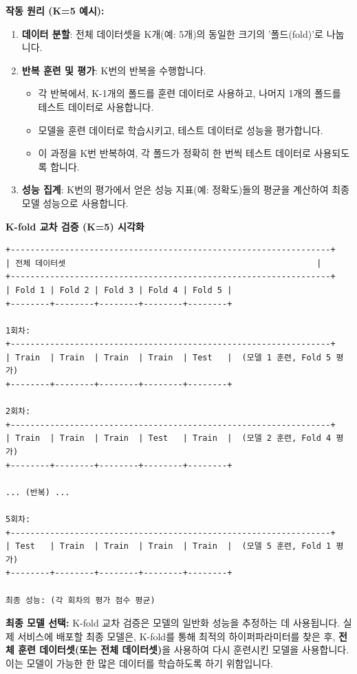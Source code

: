 \documentclass[11pt,a4paper]{article}
\theoremstyle{definition}
\begin{document}
\textbf{작동 원리 (K=5 예시):}
\begin{enumerate}
    \item \textbf{데이터 분할}: 전체 데이터셋을 K개(예: 5개)의 동일한 크기의 '폴드(fold)'로 나눕니다.
    \item \textbf{반복 훈련 및 평가}: K번의 반복을 수행합니다.
        \begin{itemize}
            \item 각 반복에서, K-1개의 폴드를 훈련 데이터로 사용하고, 나머지 1개의 폴드를 테스트 데이터로 사용합니다.
            \item 모델을 훈련 데이터로 학습시키고, 테스트 데이터로 성능을 평가합니다.
            \item 이 과정을 K번 반복하여, 각 폴드가 정확히 한 번씩 테스트 데이터로 사용되도록 합니다.
        \end{itemize}
    \item \textbf{성능 집계}: K번의 평가에서 얻은 성능 지표(예: 정확도)들의 평균을 계산하여 최종 모델 성능으로 사용합니다.
\end{enumerate}

\begin{center}
\textbf{K-fold 교차 검증 (K=5) 시각화}
\begin{verbatim}
+-----------------------------------------------------------------+
| 전체 데이터셋                                                   |
+-----------------------------------------------------------------+
| Fold 1 | Fold 2 | Fold 3 | Fold 4 | Fold 5 |
+--------+--------+--------+--------+--------+

1회차:
+-----------------------------------------------------------------+
| Train  | Train  | Train  | Train  | Test   |  (모델 1 훈련, Fold 5 평가)
+--------+--------+--------+--------+--------+

2회차:
+-----------------------------------------------------------------+
| Train  | Train  | Train  | Test   | Train  |  (모델 2 훈련, Fold 4 평가)
+--------+--------+--------+--------+--------+

... (반복) ...

5회차:
+-----------------------------------------------------------------+
| Test   | Train  | Train  | Train  | Train  |  (모델 5 훈련, Fold 1 평가)
+--------+--------+--------+--------+--------+

최종 성능: (각 회차의 평가 점수 평균)
\end{verbatim}
\end{center}

\textbf{최종 모델 선택:}
K-fold 교차 검증은 모델의 일반화 성능을 추정하는 데 사용됩니다. 실제 서비스에 배포할 최종 모델은, K-fold를 통해 최적의 하이퍼파라미터를 찾은 후, \textbf{전체 훈련 데이터셋(또는 전체 데이터셋)}을 사용하여 다시 훈련시킨 모델을 사용합니다. 이는 모델이 가능한 한 많은 데이터를 학습하도록 하기 위함입니다.
\end{document}
